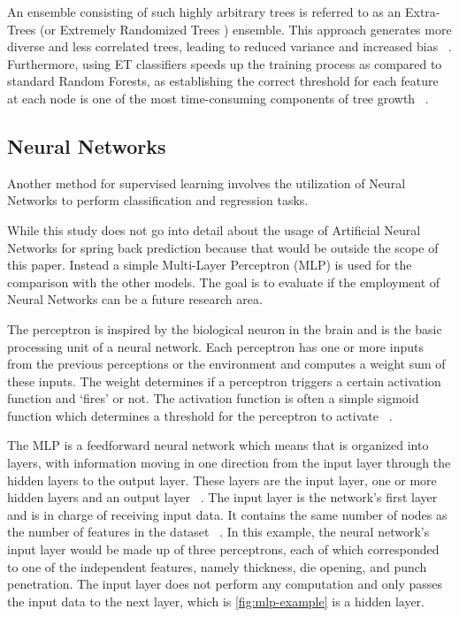 {An ensemble consisting of such highly arbitrary trees is referred to as an Extra-Trees (or Extremely Randomized Trees
) ensemble.
This approach generates more diverse and less correlated trees, leading to reduced variance and increased
bias
~\cite[p. 351]{geron2022hands}.
Furthermore, using ET classifiers speeds up the training process as compared to standard Random Forests, as
establishing the correct threshold for each feature at each node is one of the most time-consuming components of tree
growth
~\cite[p. 351]{geron2022hands}.

\subsection{Neural Networks}\label{subsec:neural-networks}
Another method for supervised learning involves the utilization of Neural Networks to
perform classification and regression tasks.

While this study does not go into detail about the usage of Artificial Neural Networks for spring back prediction
because that would be outside the scope of this paper.
Instead a simple Multi-Layer Perceptron (MLP) is used for the comparison with the other models. The goal is to
evaluate if the employment of Neural Networks can be a future research area.

The perceptron is inspired by the biological neuron in the brain and is the basic processing unit of a neural
network.
Each perceptron has one or more inputs from the previous perceptions or the environment and computes a weight sum of
these inputs.
The weight determines if a perceptron triggers a certain activation function and `fires' or
not.
The activation function is often a simple sigmoid function which determines a threshold for the perceptron to activate
~\cite[pp. 271--273]{alpaydin2020introduction}.

The MLP is a feedforward neural network which means that is organized into layers, with information
moving in one direction from the input layer through the hidden layers to the output
layer.
These layers are the input layer, one or more hidden layers and an output
layer
~\cite[pp. 279--280]{bishop1995neural}.
The input layer is the network's first layer and is in charge of receiving input data.
It contains the same number of nodes as the number of features in the dataset
~\cite[p. 105]{muller_introductionmachinelearning_2016}.
In this example, the neural network's input layer would be made up of three perceptrons, each of which corresponded
to one of the independent features, namely thickness, die opening, and punch penetration.
The input layer does not perform any computation and only passes the input data to the next layer, which is
\cref{fig:mlp-example} is a hidden layer.

}

